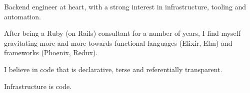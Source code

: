 

\begin{cvparagraph}

Backend engineer at heart, with a strong interest in infrastructure, tooling and
automation.

After being a Ruby (on Rails) consultant for a number of years, I find myself
gravitating more and more towards functional languages (Elixir, Elm) and
frameworks (Phoenix, Redux).

I believe in code that is declarative, terse and referentially transparent.

Infrastructure is code.
\end{cvparagraph}
